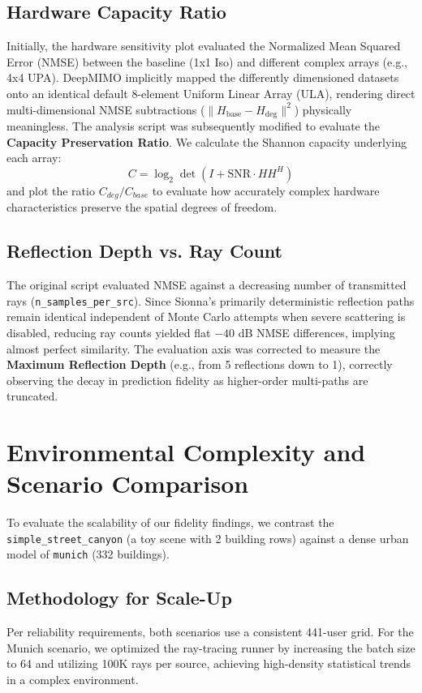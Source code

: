 \documentclass[conference]{IEEEtran}
\begin{document}
\subsection{Hardware Capacity Ratio}
Initially, the hardware sensitivity plot evaluated the Normalized Mean Squared Error (NMSE) between the baseline (1x1 Iso) and different complex arrays (e.g., 4x4 UPA). DeepMIMO implicitly mapped the differently dimensioned datasets onto an identical default 8-element Uniform Linear Array (ULA), rendering direct multi-dimensional NMSE subtractions ($\|H_{\text{base}} - H_{\text{deg}}\|^2$) physically meaningless. 
The analysis script was subsequently modified to evaluate the \textbf{Capacity Preservation Ratio}. We calculate the Shannon capacity underlying each array:
\begin{equation}
    C = \log_2 \det(I + \text{SNR} \cdot H H^H)
\end{equation}
and plot the ratio $C_{deg} / C_{base}$ to evaluate how accurately complex hardware characteristics preserve the spatial degrees of freedom.

\subsection{Reflection Depth vs. Ray Count}
The original script evaluated NMSE against a decreasing number of transmitted rays (\texttt{n\_samples\_per\_src}). Since Sionna's primarily deterministic reflection paths remain identical independent of Monte Carlo attempts when severe scattering is disabled, reducing ray counts yielded flat $-40$ dB NMSE differences, implying almost perfect similarity. 
The evaluation axis was corrected to measure the \textbf{Maximum Reflection Depth} (e.g., from 5 reflections down to 1), correctly observing the decay in prediction fidelity as higher-order multi-paths are truncated.

\section{Environmental Complexity and Scenario Comparison}
To evaluate the scalability of our fidelity findings, we contrast the \texttt{simple\_street\_canyon} (a toy scene with 2 building rows) against a dense urban model of \texttt{munich} (332 buildings). 

\subsection{Methodology for Scale-Up}
Per reliability requirements, both scenarios use a consistent 441-user grid. For the Munich scenario, we optimized the ray-tracing runner by increasing the batch size to 64 and utilizing 100K rays per source, achieving high-density statistical trends in a complex environment.
\end{document}
